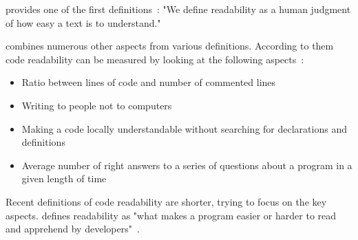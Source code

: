 \documentclass[%
class=scrreprt,
chapterprefix=false,%
open=right,%
twoside=false,%
paper=a4,%
logofile={Logo\_zentral\_farbig\_EN.png},%
thesistype=master,%
UKenglish,%
]{se2thesis}
\theoremstyle{definition}
\begin{document}
	

	
	\citeauthor{buse2009learning} provides one of the first definitions~\cite{buse2009learning}: "We define readability as a human judgment of how easy a text is to understand."

	\citeauthor{tashtoush2013impact} combines numerous other aspects from various definitions. According to them code readability can be measured by looking at the following aspects~\cite{tashtoush2013impact}:
	\begin{itemize}
		\item Ratio between lines of code and number of commented lines
		\item Writing to people not to computers
		\item Making a code locally understandable without searching for declarations and definitions
		\item Average number of right answers to a series of questions about a program in a given length of time
	\end{itemize}
	
	Recent definitions of code readability are shorter, trying to focus on the key aspects. \citeauthor{oliveira2020evaluating} defines readability as "what makes a program easier or harder to read and apprehend by developers"~\cite{oliveira2020evaluating}.
			
\end{document}
